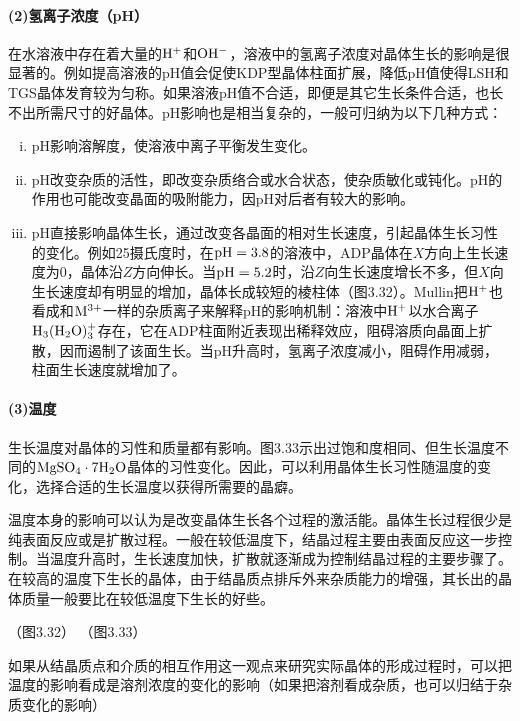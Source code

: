 \paragraph{(2)氢离子浓度（pH）}在水溶液中存在着大量的$\rm H^+$和$\rm OH^-$，溶液中的氢离子浓度对晶体生长的影响是很显著的。例如提高溶液的pH值会促使KDP型晶体柱面扩展，降低pH值使得LSH和TGS晶体发育较为匀称。如果溶液pH值不合适，即便是其它生长条件合适，也长不出所需尺寸的好晶体。pH影响也是相当复杂的，一般可归纳为以下几种方式：
\begin{enumerate}[(i)]\itemsep -0.5ex
\item pH影响溶解度，使溶液中离子平衡发生变化。
\item pH改变杂质的活性，即改变杂质络合或水合状态，使杂质敏化或钝化。pH的作用也可能改变晶面的吸附能力，因pH对后者有较大的影响。
\item pH直接影响晶体生长，通过改变各晶面的相对生长速度，引起晶体生长习性的变化。例如25摄氏度时，在$\rm pH=3.8$的溶液中，ADP晶体在$X$方向上生长速度为0，晶体沿$Z$方向伸长。当$\rm pH=5.2$时，沿$Z$向生长速度增长不多，但$X$向生长速度却有明显的增加，晶体长成较短的棱柱体（图3.32）。Mullin把$\rm H^+$也看成和$\rm M^{3+}$一样的杂质离子来解释pH的影响机制：溶液中$\rm H^+$以水合离子$\rm H_3(H_2O)_3^+$存在，它在ADP柱面附近表现出稀释效应，阻碍溶质向晶面上扩散，因而遏制了该面生长。当pH升高时，氢离子浓度减小，阻碍作用减弱，柱面生长速度就增加了。
\end{enumerate}


\paragraph{(3)温度}生长温度对晶体的习性和质量都有影响。图3.33示出过饱和度相同、但生长温度不同的$\rm MgSO_4\cdot 7H_2O$晶体的习性变化。因此，可以利用晶体生长习性随温度的变化，选择合适的生长温度以获得所需要的晶癖。

温度本身的影响可以认为是改变晶体生长各个过程的激活能。晶体生长过程很少是纯表面反应或是扩散过程。一般在较低温度下，结晶过程主要由表面反应这一步控制。当温度升高时，生长速度加快，扩散就逐渐成为控制结晶过程的主要步骤了。在较高的温度下生长的晶体，由于结晶质点排斥外来杂质能力的增强，其长出的晶体质量一般要比在较低温度下生长的好些。

（图3.32）
（图3.33）

如果从结晶质点和介质的相互作用这一观点来研究实际晶体的形成过程时，可以把温度的影响看成是溶剂浓度的变化的影响（如果把溶剂看成杂质，也可以归结于杂质变化的影响）


